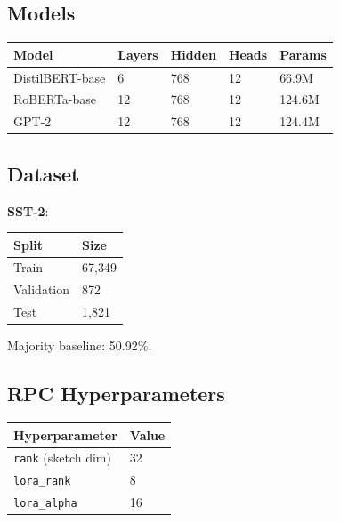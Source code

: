 \subsection{Models}

\begin{table}[H]
\centering
\small
\begin{tabular}{lllll}
\toprule
\textbf{Model} & \textbf{Layers} & \textbf{Hidden} & \textbf{Heads} & \textbf{Params} \\
\midrule
DistilBERT-base & 6 & 768 & 12 & 66.9M \\
RoBERTa-base & 12 & 768 & 12 & 124.6M \\
GPT-2 & 12 & 768 & 12 & 124.4M \\
\bottomrule
\end{tabular}
\end{table}

\subsection{Dataset}

\textbf{SST-2}:

\begin{table}[H]
\centering
\small
\begin{tabular}{ll}
\toprule
\textbf{Split} & \textbf{Size} \\
\midrule
Train & 67,349 \\
Validation & 872 \\
Test & 1,821 \\
\bottomrule
\end{tabular}
\end{table}

Majority baseline: 50.92\%.

\subsection{RPC Hyperparameters}

\begin{table}[H]
\centering
\small
\begin{tabular}{ll}
\toprule
\textbf{Hyperparameter} & \textbf{Value} \\
\midrule
\texttt{rank} (sketch dim) & 32 \\
\texttt{lora\_rank} & 8 \\
\texttt{lora\_alpha} & 16 \\
\bottomrule
\end{tabular}
\end{table}

